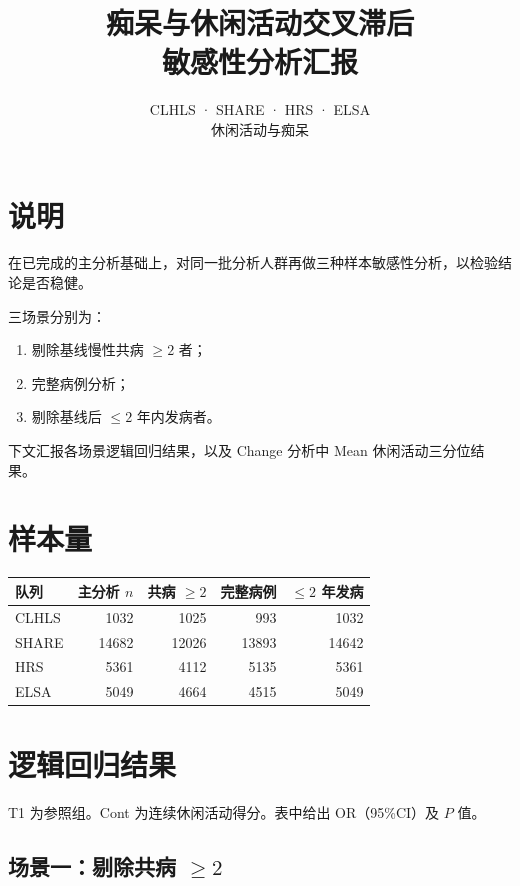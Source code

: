\documentclass[11pt,a4paper]{article}
\title{\textbf{痴呆与休闲活动交叉滞后\\敏感性分析汇报}}
\author{CLHLS · SHARE · HRS · ELSA\\休闲活动与痴呆}
\date{}
\begin{document}
\maketitle

\section{说明}

在已完成的主分析基础上，对同一批分析人群再做三种样本敏感性分析，以检验结论是否稳健。

三场景分别为：
\begin{enumerate}[leftmargin=1.6em]
  \item 剔除基线慢性共病 $\ge 2$ 者；
  \item 完整病例分析；
  \item 剔除基线后 $\le 2$ 年内发病者。
\end{enumerate}

下文汇报各场景逻辑回归结果，以及 Change 分析中 Mean 休闲活动三分位结果。

\section{样本量}

\begin{center}
\begin{tabular}{lrrrr}
\toprule
队列 & 主分析 $n$ & 共病 $\ge 2$ & 完整病例 & $\le 2$ 年发病 \\
\midrule
CLHLS & 1032 & 1025 & 993 & 1032 \\
SHARE & 14682 & 12026 & 13893 & 14642 \\
HRS & 5361 & 4112 & 5135 & 5361 \\
ELSA & 5049 & 4664 & 4515 & 5049 \\
\bottomrule
\end{tabular}
\end{center}

\section{逻辑回归结果}

T1 为参照组。Cont 为连续休闲活动得分。表中给出 OR（95\%CI）及 $P$ 值。

\subsection{场景一：剔除共病 $\ge 2$}
\end{document}
